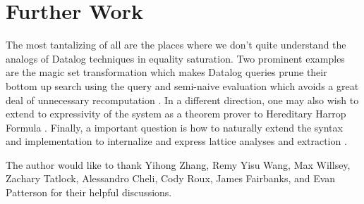 \documentclass[sigplan,10pt,review]{acmart} %
\begin{document}
\section{Further Work}
The most tantalizing of all are the places where we don't quite understand the analogs of Datalog techniques in equality saturation.
Two prominent examples are the magic set transformation which makes Datalog queries prune their bottom up search using the query and semi-naive evaluation which avoids a great deal of unnecessary recomputation \cite{databases}.
In a different direction, one may also wish to extend to expressivity of the system as a theorem prover to Hereditary Harrop Formula \cite{miller_nadathur_2012}.
Finally, a important question is how to naturally extend the syntax and implementation to internalize and express lattice analyses and extraction \cite{egg}.

\begin{acks}                            %
The author would like to thank Yihong Zhang, Remy Yisu Wang, Max Willsey, Zachary Tatlock, Alessandro Cheli, Cody Roux, James Fairbanks, and Evan Patterson for their helpful discussions.
\end{acks}






\end{document}
